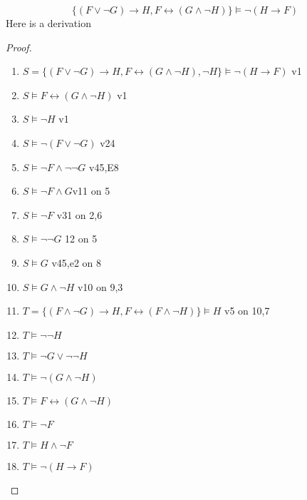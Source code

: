 \[
\{(F\vee \neg G) \to H, F\leftrightarrow (G\wedge \neg H)\}\vDash \neg (H\to F)
\]
Here is a derivation

\begin{proof}
\begin{enumerate}
    \item $S = \{(F\vee \neg G) \to H, F\leftrightarrow (G\wedge \neg H), \neg H\}\vDash \neg (H\to F)$  \hfill v1
    \item $S\vDash F \leftrightarrow (G\wedge \neg H)$ \hfill v1
    \item $S\vDash \neg H$ \hfill v1 
    \item $S\vDash \neg (F\vee \neg G)$ \hfill v24
    \item $S \vDash \neg F \wedge \neg \neg G$ \hfill v45,E8
    \item $S \vDash \neg F \wedge G $\hfill v11 on 5
    \item $S \vDash \neg F$ \hfill v31 on 2,6
    \item $S\vDash \neg \neg G$ \hfill 12 on 5
    \item $S\vDash G$ \hfill v45,e2 on 8
    \item $S\vDash G\wedge \neg H$ \hfill v10 on 9,3
    \item $T = \{(F\wedge \neg G)\to H,F\leftrightarrow(F\wedge\neg H)\} \vDash H$ \hfill v5 on 10,7
    \item $T \vDash \neg \neg H$
    \item $T \vDash \neg G \vee \neg \neg H$
    \item $T \vDash \neg (G\wedge \neg H)$
    \item $T \vDash F \leftrightarrow (G\wedge \neg H)$
    \item $T \vDash  \neg F$
    \item $T\vDash H\wedge \neg F$
    \item $T \vDash \neg (H\to F)$
\end{enumerate}
\end{proof}



